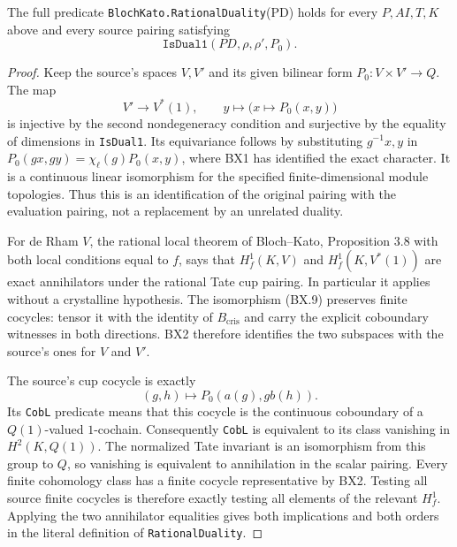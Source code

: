 \begin{proposition}
\label{claim:BX5}
The full predicate \texttt{Bloch\allowbreak Kato.\allowbreak Rational\allowbreak Duality}(PD)
holds for every $P,AI,T,K$ above and every source pairing satisfying
\[
                     \texttt{IsDual1}(PD,\rho,\rho',P_0).
\]
\end{proposition}
\begin{proof}
Keep the source's spaces $V,V'$ and its given bilinear form
$P_0:V\times V'\to Q$.  The map
\[
             V'\longrightarrow V^*(1),\qquad
             y\longmapsto\bigl(x\longmapsto P_0(x,y)\bigr)
                                                               \tag{BX.9}
\]
is injective by the second nondegeneracy condition and
surjective by the equality of dimensions in \texttt{Is\allowbreak Dual1}.
Its equivariance follows by substituting $g^{-1}x,y$ in
$P_0(gx,gy)=\chi_\ell(g)P_0(x,y)$, where BX1 has identified
the exact character.  It is a continuous linear isomorphism
for the specified finite-dimensional module topologies.
Thus this is an identification of the original pairing with
the evaluation pairing, not a replacement by an unrelated
duality.

For de Rham $V$, the rational local theorem of Bloch--Kato,
Proposition 3.8 with both local conditions equal to $f$,
says that $H_f^1(K,V)$ and $H_f^1(K,V^*(1))$ are exact
annihilators under the rational Tate cup pairing.
In particular it applies without a crystalline hypothesis.
The isomorphism (BX.9) preserves finite cocycles: tensor it
with the identity of $B_{\mathrm{cris}}$ and carry the
explicit coboundary witnesses in both directions.
BX2 therefore identifies the two subspaces with the source's
ones for $V$ and $V'$.

The source's cup cocycle is exactly
\[
              (g,h)\longmapsto P_0(a(g),g b(h)).
                                                               \tag{BX.10}
\]
Its \texttt{Cob\allowbreak L} predicate means that this cocycle is the
continuous coboundary of a $Q(1)$-valued $1$-cochain.
Consequently \texttt{Cob\allowbreak L} is equivalent to its class
vanishing in $H^2(K,Q(1))$.  The normalized Tate invariant is
an isomorphism from this group to $Q$, so vanishing is
equivalent to annihilation in the scalar pairing.
Every finite cohomology class has a finite cocycle
representative by BX2.  Testing all source finite cocycles
is therefore exactly testing all elements of the relevant
$H_f^1$.  Applying the two annihilator equalities gives
both implications and both orders in the literal definition
of \texttt{Rational\allowbreak Duality}.
\end{proof}

